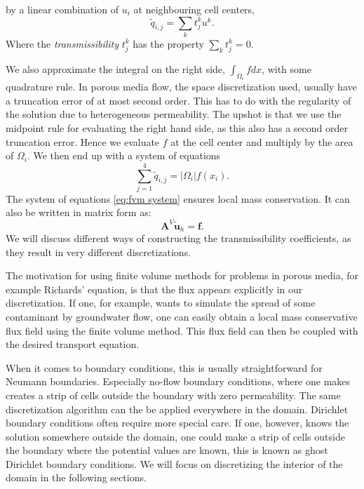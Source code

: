 \documentclass[../Main/main.tex]{subfiles}
\begin{document}
	by a linear combination of $u_i$ at neighbouring cell centers,
	\begin{equation}
		\tilde{q}_{i,j} = \sum_{k}t_{j}^k u^k.
	\end{equation}
	Where the \emph{transmissibility } $t_{j}^k$ has the property $\sum_k t_{j}^k = 0$. \par
	We also approximate the integral on the right side, $\int_{\Omega_i}fdx$, with some quadrature rule. In porous media flow, the space discretization used, usually have a truncation error of at most second order. This has to do with the regularity of the solution due to heterogeneous permeability. The upshot is that we use the midpoint rule for evaluating the right hand side, as this also has a second order truncation error. Hence we evaluate $f$ at the cell center and multiply by the area of $\Omega_i$. We then end up with a system of equations
	\begin{equation}\label{eq:fvm system}
		\sum_{j=1}^4 \tilde{q}_{i,j} = |\Omega_i|f(x_i).
	\end{equation}
	The system of equations \eqref{eq:fvm system} ensures local mass conservation. It can also be written in matrix form as:
	\begin{equation}
		\bm{A}^V\tilde{\bm{u}}_h = \bm{f}.
	\end{equation}
	 We will discuss different ways of constructing the transmissibility coefficients, as they result in very different discretizations.
	\par
	The motivation for using finite volume methods for problems in porous media, for example Richards' equation, is that the flux appears explicitly in our discretization. If one, for example, wants to simulate the spread of some contaminant by groundwater flow, one can easily obtain a local mass conservative flux field using the finite volume method. This flux field can then be coupled with the desired transport equation.
	\par 
	When it comes to boundary conditions, this is usually straightforward for Neumann boundaries. Especially no-flow boundary conditions, where one makes creates a strip of cells outside the boundary with zero permeability. The same discretization algorithm can the be applied everywhere in the domain. Dirichlet boundary conditions often require more special care. If one, however, knows the solution somewhere outside the domain, one could make a strip of cells outside the boundary where the potential values are known, this is known as ghost Dirichlet boundary conditions. We will focus on discretizing the interior of the domain in the following sections.
\end{document}
